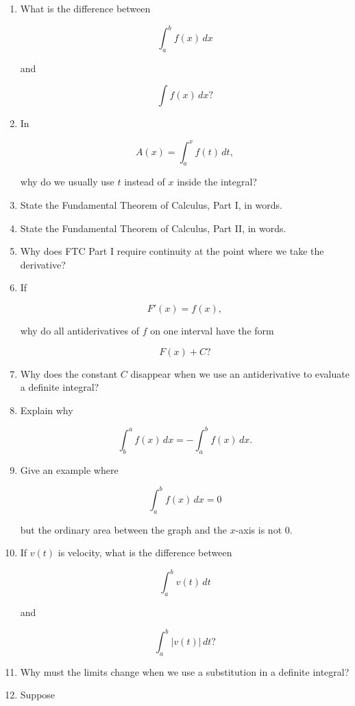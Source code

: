 \begin{enumerate}
\item What is the difference between

\[
\int_a^b f(x)\,dx
\]

and

\[
\int f(x)\,dx?
\]

\item In

\[
A(x)=\int_a^x f(t)\,dt,
\]

why do we usually use \(t\) instead of \(x\) inside the integral?

\item State the Fundamental Theorem of Calculus, Part I, in words.

\item State the Fundamental Theorem of Calculus, Part II, in words.

\item Why does FTC Part I require continuity at the point where we take the derivative?

\item If

\[
F'(x)=f(x),
\]

why do all antiderivatives of \(f\) on one interval have the form

\[
F(x)+C?
\]

\item Why does the constant \(C\) disappear when we use an antiderivative to evaluate
a definite integral?

\item Explain why

\[
\int_b^a f(x)\,dx=-\int_a^b f(x)\,dx.
\]

\item Give an example where

\[
\int_a^b f(x)\,dx=0
\]

but the ordinary area between the graph and the \(x\)-axis is not \(0\).

\item If \(v(t)\) is velocity, what is the difference between

\[
\int_a^b v(t)\,dt
\]

and

\[
\int_a^b |v(t)|\,dt?
\]

\item Why must the limits change when we use a substitution in a definite integral?

\item Suppose


\end{enumerate}
